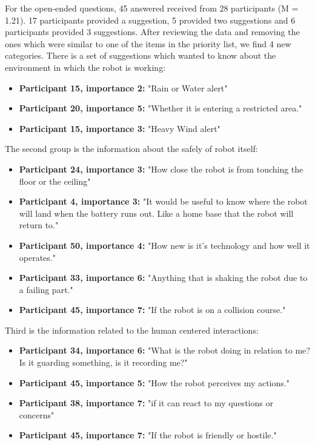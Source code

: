 \documentclass[letterpaper, 10 pt, conference]{ieeeconf}  %
\begin{document}
For the open-ended questions, 45 answered received from 28 participants (M = 1.21). 17 participants provided a suggestion, 5 provided two suggestions and 6 participants provided 3 suggestions. After reviewing the data and removing the ones which were similar to one of the items in the priority list, we find 4 new categories. There is a set of suggestions which wanted to know about the environment in which the robot is working: 
\begin{itemize}
    \item  \textbf{Participant 15, importance 2:} "Rain or Water alert"
    \item  \textbf{Participant 20, importance 5:} "Whether it is entering a restricted area."
    \item  \textbf{Participant 15, importance 3:} "Heavy Wind alert"
\end{itemize}



The second group is the information about the safely of robot itself:
\begin{itemize}
    \item  \textbf{Participant 24, importance 3:} "How close the robot is from touching the floor or the ceiling"
    \item  \textbf{Participant 4, importance 3:} "It would be useful to know where the robot will land when the battery runs out. Like a home base that the robot will return to."
    \item  \textbf{Participant 50, importance 4:} "How new is it's technology and how well it operates."
    \item  \textbf{Participant 33, importance 6:} "Anything that is shaking the robot due to a failing part."
    \item  \textbf{Participant 45, importance 7:} "If the robot is on a collision course."
\end{itemize}

Third is the information related to the human centered interactions:
\begin{itemize}
    \item  \textbf{Participant 34, importance 6:} "What is the robot doing in relation to me? Is it guarding something, is it recording me?"
    \item  \textbf{Participant 45, importance 5:} "How the robot perceives my actions."
    \item  \textbf{Participant 38, importance 7:} "if it can react to my questions or concerns"
    \item  \textbf{Participant 45, importance 7:} "If the robot is friendly or hostile."
\end{itemize}
\end{document}
